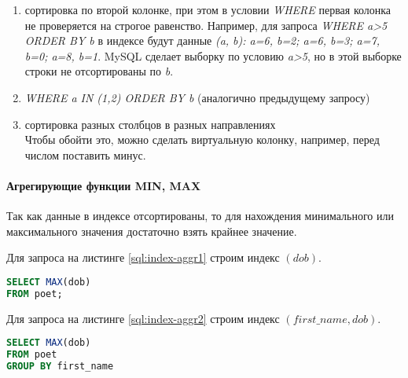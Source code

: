 \begin{enumerate}
\item сортировка по второй колонке, при этом в условии \textit{WHERE} первая колонка не проверяется на строгое равенство. Например, для запроса \textit{WHERE a>5 ORDER BY b} в индексе будут данные \textit{(a, b): a=6, b=2; a=6, b=3; a=7, b=0; a=8, b=1}. MySQL сделает выборку по условию \textit{a>5}, но в этой выборке строки не отсортированы по \textit{b}.
\item \textit{WHERE a IN (1,2) ORDER BY b} (аналогично предыдущему запросу)
\item сортировка разных столбцов в разных направлениях\\
Чтобы обойти это, можно сделать виртуальную колонку, например, перед числом поставить минус.
\end{enumerate}



\paragraph{Агрегирующие функции MIN, MAX}

Так как данные в индексе отсортированы, то для нахождения минимального или максимального значения достаточно взять крайнее значение.

Для запроса на листинге \ref{sql:index-aggr1} строим индекс $(dob)$.
\begin{lstlisting}[language=sql, label=sql:index-aggr1, caption={запрос для index-aggr}]
SELECT MAX(dob) 
FROM poet;
\end{lstlisting}

Для запроса на листинге \ref{sql:index-aggr2} строим индекс $(first\_name, dob)$.
\begin{lstlisting}[language=sql, label=sql:index-aggr2, caption={запрос для index-aggr}]
SELECT MAX(dob) 
FROM poet
GROUP BY first_name
\end{lstlisting}


